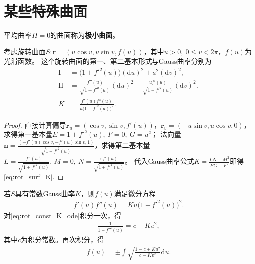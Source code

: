 \documentclass[../../main.tex]{subfiles}%
\begin{document}
\section{某些特殊曲面}

\begin{definition}
平均曲率$H=0$的曲面称为\textbf{极小曲面}。
\end{definition}

\begin{proposition}
考虑旋转曲面$S:\boldsymbol{r}=(u\cos v,u\sin v,f(u))$，其中$u>0,\ 0\leqslant v<2\pi$，$f(u)$为光滑函数。
这个旋转曲面的第一、第二基本形式与Gauss曲率分别为
\begin{align}
\mathrm{I}&=\big(1+f'^2(u)\big)(\mathrm{d}u)^2+u^2(\mathrm{d}v)^2,\label{eq:rot_surf_I}\\
\mathrm{II}&=\frac{f''(u)}{\sqrt{1+f'^2(u)}}(\mathrm{d}u)^2+\frac{uf'(u)}{\sqrt{1+f'^2(u)}}(\mathrm{d}v)^2,\label{eq:rot_surf_II}\\
K&=\frac{f'(u)f''(u)}{u\big(1+f'^2(u)\big)^2}.\label{eq:rot_surf_K}
\end{align}
\end{proposition}
\begin{proof}
直接计算偏导$\boldsymbol{r}_u=(\cos v,\sin v,f'(u))$，$\boldsymbol{r}_v=(-u\sin v,u\cos v,0)$，求得第一基本量$E=1+f'^2(u),\ F=0,\ G=u^2$；
法向量$\boldsymbol{n}=\frac{(-f'(u)\cos v,-f'(u)\sin v,1)}{\sqrt{1+f'^2(u)}}$，求得第二基本量$L=\frac{f''(u)}{\sqrt{1+f'^2(u)}},\ M=0,\ N=\frac{uf'(u)}{\sqrt{1+f'^2(u)}}$。
代入Gauss曲率公式$K=\frac{LN-M^2}{EG-F^2}$即得\eqref{eq:rot_surf_K}.
\end{proof}

若$S$具有常数Gauss曲率$K$，则$f(u)$满足微分方程
\begin{align}
f'(u)f''(u)=Ku\big(1+f'^2(u)\big)^2.\label{eq:rot_const_K_ode}
\end{align}
对\eqref{eq:rot_const_K_ode}积分一次，得
\begin{align}
\frac{1}{1+f'^2(u)}=c-Ku^2,\label{eq:rot_const_K_int1}
\end{align}
其中$c$为积分常数。再次积分，得
\begin{align}
f(u)=\pm\int\sqrt{\frac{1-c+Ku^2}{c-Ku^2}}\mathrm{d}u.\label{eq:rot_const_K_int2}
\end{align}
\end{document}

